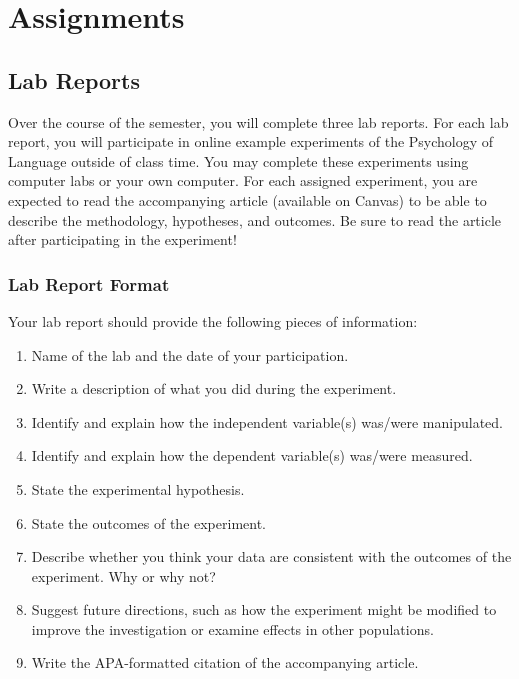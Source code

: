\documentclass[
  letterpaper,
  DIV=11,
  numbers=noendperiod]{scrreprt}
\providecommand{\tightlist}{%
  \setlength{\itemsep}{0pt}\setlength{\parskip}{0pt}}\usepackage{longtable,booktabs,array}
\begin{document}
\part{Assignments}

\hypertarget{lab-reports}{%
\chapter*{Lab Reports}\label{lab-reports}}


Over the course of the semester, you will complete three lab reports.
For each lab report, you will participate in online example experiments
of the Psychology of Language outside of class time. You may complete
these experiments using computer labs or your own computer. For each
assigned experiment, you are expected to read the accompanying article
(available on Canvas) to be able to describe the methodology,
hypotheses, and outcomes. Be sure to read the article after
participating in the experiment!

\hypertarget{lab-report-format}{%
\section*{Lab Report Format}\label{lab-report-format}}


Your lab report should provide the following pieces of information:

\begin{enumerate}
\def\labelenumi{\arabic{enumi}.}
\tightlist
\item
  Name of the lab and the date of your participation.
\item
  Write a description of what you did during the experiment.
\item
  Identify and explain how the independent variable(s) was/were
  manipulated.
\item
  Identify and explain how the dependent variable(s) was/were measured.
\item
  State the experimental hypothesis.
\item
  State the outcomes of the experiment.
\item
  Describe whether you think your data are consistent with the outcomes
  of the experiment. Why or why not?
\item
  Suggest future directions, such as how the experiment might be
  modified to improve the investigation or examine effects in other
  populations.
\item
  Write the APA-formatted citation of the accompanying article.
\end{enumerate}
\end{document}
